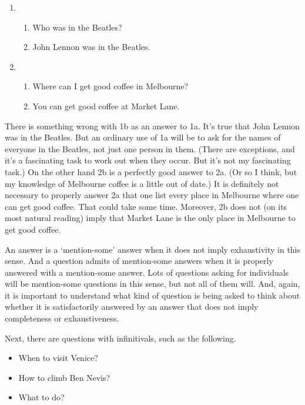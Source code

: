 \documentclass[
  11pt,
]{book}
\providecommand{\tightlist}{%
  \setlength{\itemsep}{0pt}\setlength{\parskip}{0pt}}
\begin{document}
\begin{enumerate}
\def\labelenumi{\arabic{enumi}.}
\item
  \begin{enumerate}
  \def\labelenumii{\alph{enumii}.}
  \tightlist
  \item
    Who was in the Beatles?
  \item
    John Lennon was in the Beatles.
  \end{enumerate}
\item
  \begin{enumerate}
  \def\labelenumii{\alph{enumii}.}
  \tightlist
  \item
    Where can I get good coffee in Melbourne?
  \item
    You can get good coffee at Market Lane.
  \end{enumerate}
\end{enumerate}

There is something wrong with 1b as an answer to 1a. It's true that John Lennon was in the Beatles. But an ordinary use of 1a will be to ask for the names of everyone in the Beatles, not just one person in them. (There are exceptions, and it's a fascinating task to work out when they occur. But it's not my fascinating task.) On the other hand 2b is a perfectly good answer to 2a. (Or so I think, but my knowledge of Melbourne coffee is a little out of date.) It is definitely not necessary to properly answer 2a that one list every place in Melbourne where one can get good coffee. That could take some time. Moreover, 2b does not (on its most natural reading) imply that Market Lane is the only place in Melbourne to get good coffee.

An answer is a `mention-some' answer when it does not imply exhaustivity in this sense. And a question admits of mention-some answers when it is properly answered with a mention-some answer. Lots of questions asking for individuals will be mention-some questions in this sense, but not all of them will. And, again, it is important to understand what kind of question is being asked to think about whether it is satisfactorily answered by an answer that does not imply completeness or exhaustiveness.

Next, there are questions with infinitivals, such as the following.

\begin{itemize}
\tightlist
\item
  When to visit Venice?
\item
  How to climb Ben Nevis?
\item
  What to do?
\end{itemize}
\end{document}
